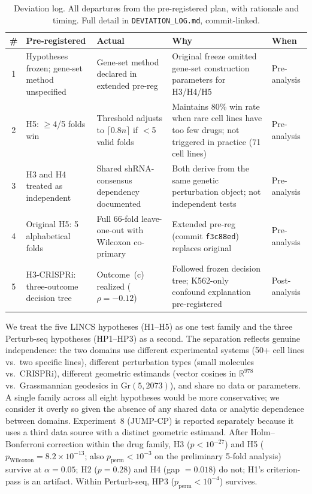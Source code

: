 \documentclass[11pt]{article}
\begin{document}
\begin{table}[t]
\centering
\caption{Deviation log. All departures from the pre-registered plan, with
rationale and timing. Full detail in \texttt{DEVIATION\_LOG.md},
commit-linked.}
\label{tab:deviations}
\small
\begin{tabular}{cp{3.2cm}p{3.2cm}p{3.8cm}l}
\toprule
\# & Pre-registered & Actual & Why & When \\
\midrule
1 & Hypotheses frozen; gene-set method unspecified &
  Gene-set method declared in extended pre-reg &
  Original freeze omitted gene-set construction parameters for H3/H4/H5 &
  Pre-analysis \\
2 & H5: $\geq$4/5 folds win &
  Threshold adjusts to $\lceil 0.8 n \rceil$ if $<$5 valid folds &
  Maintains 80\% win rate when rare cell lines have too few drugs;
  not triggered in practice (71 cell lines) &
  Pre-analysis \\
3 & H3 and H4 treated as independent &
  Shared shRNA-consensus dependency documented &
  Both derive from the same genetic perturbation object; not independent tests &
  Pre-analysis \\
4 & Original H5: 5 alphabetical folds &
  Full 66-fold leave-one-out with Wilcoxon co-primary &
  Extended pre-reg (commit \texttt{f3c88ed}) replaces original &
  Pre-analysis \\
5 & H3-CRISPRi: three-outcome decision tree &
  Outcome~(c) realized ($\rho = -0.12$) &
  Followed frozen decision tree; K562-only confound explanation pre-registered &
  Post-analysis \\
\bottomrule
\end{tabular}
\end{table}

We treat the five LINCS hypotheses (H1--H5) as one test family and the
three Perturb-seq hypotheses (HP1--HP3) as a second. The separation
reflects genuine independence: the two domains use different experimental
systems (50+ cell lines vs.\ two specific lines), different perturbation types
(small molecules vs.\ CRISPRi), different geometric estimands (vector
cosines in $\mathbb{R}^{978}$ vs.\ Grassmannian geodesics in Gr$(5, 2073)$),
and share no data or parameters. A single family across all eight hypotheses
would be more conservative; we consider it overly so given the absence of
any shared data or analytic dependence between domains. Experiment~8
(JUMP-CP) is reported separately because it uses a third data source with
a distinct geometric estimand. After Holm--Bonferroni
correction within the drug family, H3 ($p < 10^{-27}$) and H5
($p_{\text{Wilcoxon}} = 8.2 \times 10^{-13}$; also
$p_{\text{perm}} < 10^{-3}$ on the preliminary 5-fold analysis) survive
at $\alpha = 0.05$; H2 ($p = 0.28$) and H4 (gap $= 0.018$) do not;
H1's criterion-pass is an artifact.
Within Perturb-seq, HP3 ($p_{\text{perm}} < 10^{-4}$) survives.
\end{document}
